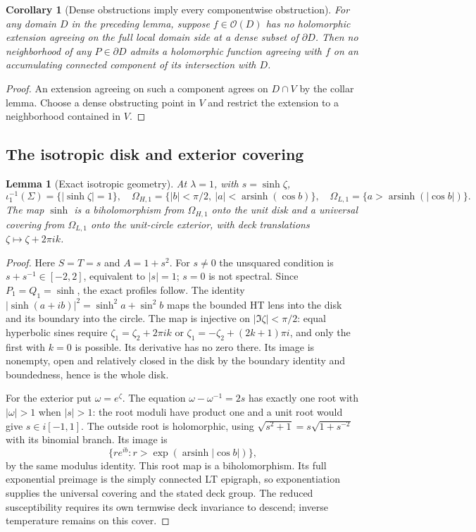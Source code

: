 \documentclass[11pt]{article}
\numberwithin{equation}{section}
\newtheorem{lemma}[theorem]{Lemma}
\newtheorem{corollary}[theorem]{Corollary}
\theoremstyle{definition}
\begin{document}
\begin{corollary}[Dense obstructions imply every componentwise obstruction]
\label{geo:propagate-obstruction}
For any domain $D$ in the preceding lemma, suppose $f\in\mathcal O(D)$
has no holomorphic extension agreeing on the full local domain side
at a dense subset of $\partial D$.  Then no neighborhood of any
$P\in\partial D$ admits a holomorphic function agreeing with $f$
on an accumulating connected component of its intersection with $D$.
\end{corollary}
\begin{proof}
An extension agreeing on such a component agrees on $D\cap V$ by
the collar lemma.  Choose a dense obstructing point in $V$ and
restrict the extension to a neighborhood contained in $V$.
\end{proof}

\subsection{The isotropic disk and exterior covering}
\begin{lemma}[Exact isotropic geometry]\label{geo:isotropic-cover}
At $\lambda=1$, with $s=\sinh\zeta$,
\[
 \iota_1^{-1}(\Sigma)=\{|\sinh\zeta|=1\},\quad
 \Omega_{H,1}=\{|b|<\pi/2,\ |a|<\operatorname{arsinh}(\cos b)\},\quad
 \Omega_{L,1}=\{a>\operatorname{arsinh}(|\cos b|)\}.
\]
The map $\sinh$ is a biholomorphism from $\Omega_{H,1}$ onto the
unit disk and a universal covering from $\Omega_{L,1}$ onto the
unit-circle exterior, with deck translations $\zeta\mapsto\zeta+2\pi i k$.
\end{lemma}
\begin{proof}
Here $S=T=s$ and $A=1+s^2$.  For $s\ne0$ the unsquared condition
is $s+s^{-1}\in[-2,2]$, equivalent to $|s|=1$; $s=0$ is not
spectral.  Since $P_1=Q_1=\sinh$, the exact profiles follow.
The identity $|\sinh(a+ib)|^2=\sinh^2a+\sin^2b$ maps the bounded
HT lens into the disk and its boundary into the circle.  The map
is injective on $|\Im\zeta|<\pi/2$: equal hyperbolic sines require
$\zeta_1=\zeta_2+2\pi i k$ or
$\zeta_1=-\zeta_2+(2k+1)\pi i$, and only the first with $k=0$
is possible.  Its derivative has no zero there.  Its image is
nonempty, open and relatively closed in the disk by the boundary
identity and boundedness, hence is the whole disk.

For the exterior put $\omega=e^\zeta$.  The equation
$\omega-\omega^{-1}=2s$ has exactly one root with $|\omega|>1$
when $|s|>1$: the root moduli have product one and a unit root
would give $s\in i[-1,1]$.  The outside root is holomorphic,
using $\sqrt{s^2+1}=s\sqrt{1+s^{-2}}$ with its binomial branch.
Its image is
\[
 \{re^{ib}: r>\exp(\operatorname{arsinh}|\cos b|)\},
\]
by the same modulus identity.  This root map is a biholomorphism.
Its full exponential preimage is the simply connected LT epigraph,
so exponentiation supplies the universal covering and the stated
deck group.  The reduced susceptibility requires its own termwise
deck invariance to descend; inverse temperature remains on this cover.
\end{proof}
\end{document}

